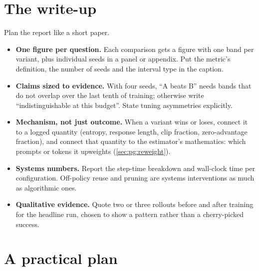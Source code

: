 \section{The write-up}\label{sec:proj5:writeup}

Plan the report like a short paper.
\begin{itemize}
\item \textbf{One figure per question.} Each comparison gets a figure with one band per variant, plus
  individual seeds in a panel or appendix. Put the metric's definition, the number of seeds and the
  interval type in the caption.
\item \textbf{Claims sized to evidence.} With four seeds, ``A beats B'' needs bands that do not overlap over
  the last tenth of training; otherwise write ``indistinguishable at this budget''. State tuning
  asymmetries explicitly.
\item \textbf{Mechanism, not just outcome.} When a variant wins or loses, connect it to a logged quantity
  (entropy, response length, clip fraction, zero-advantage fraction), and connect that quantity to the
  estimator's mathematics: which prompts or tokens it upweights (\cref{sec:pg:reweight}).
\item \textbf{Systems numbers.} Report the step-time breakdown and wall-clock time per configuration.
  Off-policy reuse and pruning are systems interventions as much as algorithmic ones.
\item \textbf{Qualitative evidence.} Quote two or three rollouts before and after training for the
  headline run, chosen to show a pattern rather than a cherry-picked success.
\end{itemize}

\section{A practical plan}\label{sec:proj5:plan}

